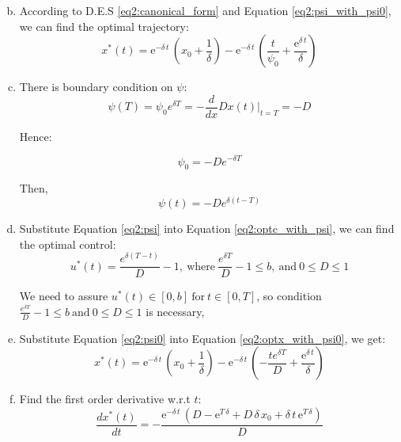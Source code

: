 \begin{enumerate}[a)]
\begin{equation}
             \end{equation}
    \item According to D.E.S \eqref{eq2:canonical_form} and Equation \eqref{eq2:psi_with_psi0}, we can find the optimal trajectory:
             \begin{equation}\label{eq2:optx_with_psi0}
                 x^*(t)={\mathrm{e}}^{-\delta \,t}\,\left(x_{0}+\frac{1}{\delta }\right)-{\mathrm{e}}^{-\delta \,t}\,\left(\frac{t}{\psi _{0}}+\frac{{\mathrm{e}}^{\delta \,t}}{\delta }\right)
             \end{equation}
    \item There is boundary condition on $\psi$:
    \begin{equation}
        \psi(T)=\psi_0 e^{\delta T}=-\frac{d}{dx}Dx(t)\bigg|_{t=T}=-D
    \end{equation}

    Hence:

    \begin{equation}\label{eq2:psi0}
        \psi_0=-De^{-\delta T}
    \end{equation}

    Then,
    \begin{equation}\label{eq2:psi}
        \psi(t)=-De^{\delta (t-T)}
    \end{equation}

    \item Substitute Equation \eqref{eq2:psi} into Equation \eqref{eq2:optc_with_psi}, we can find the optimal control:
    \begin{equation}
        u^*(t)=\frac{e^{\delta(T-t)}}{D}-1,\ \text{where}\ \frac{e^{\delta T}}{D}-1\leq b,\ \text{and}\ 0\leq D\leq1
    \end{equation}

    We need to assure $u^*(t)\in [0,b]\ \text{for}\ t\in[0,T]$, so condition $\frac{e^{\delta T}}{D}-1\leq b\ \text{and}\ 0\leq D\leq 1$ is necessary,

    \item Substitute Equation \eqref{eq2:psi0} into Equation \eqref{eq2:optx_with_psi0}, we get:
    \begin{equation}\label{eq2:optx}
        x^*(t)={\mathrm{e}}^{-\delta \,t}\,\left(x_{0}+\frac{1}{\delta }\right)-{\mathrm{e}}^{-\delta \,t}\,\left(-\frac{te^{\delta T}}{D}+\frac{{\mathrm{e}}^{\delta \,t}}{\delta }\right)
    \end{equation}


    \item  Find the first order derivative w.r.t $t$:
    \begin{equation}\label{eq2:optx_d}
        \frac{dx^*(t)}{dt}=-\frac{{\mathrm{e}}^{-\delta \,t}\,\left(D-{\mathrm{e}}^{T\,\delta }+D\,\delta \,x_{0}+\delta \,t\,{\mathrm{e}}^{T\,\delta }\right)}{D}
    \end{equation}


\end{enumerate}
